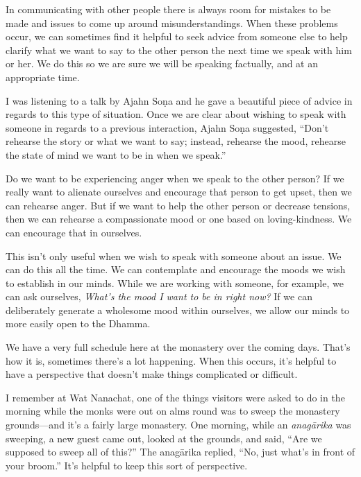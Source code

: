 
In communicating with other people there is always room for mistakes to 
be made and issues to come up around misunderstandings. When these 
problems occur, we can sometimes find it helpful to seek advice from 
someone else to help clarify what we want to say to the other person 
the next time we speak with him or her. We do this so we are sure we 
will be speaking factually, and at an appropriate time.

I was listening to a talk by Ajahn Soṇa and he gave a beautiful piece 
of advice in regards to this type of situation. Once we are clear about 
wishing to speak with someone in regards to a previous interaction, 
Ajahn Soṇa suggested, ``Don't rehearse the story or what we want to 
say; instead, rehearse the mood, rehearse the state of mind we want to 
be in when we speak.''

Do we want to be experiencing anger when we speak to the other person? 
If we really want to alienate ourselves and encourage that person to 
get upset, then we can rehearse anger. But if we want to help the other 
person or decrease tensions, then we can rehearse a compassionate mood 
or one based on loving-kindness. We can encourage that in ourselves.

This isn't only useful when we wish to speak with someone about an 
issue. We can do this all the time. We can contemplate and encourage 
the moods we wish to establish in our minds. While we are working with 
someone, for example, we can ask ourselves, \emph{What's the mood I 
want to be in right now?} If we can deliberately generate a wholesome 
mood within ourselves, we allow our minds to more easily open to the 
Dhamma.


We have a very full schedule here at the monastery over the coming 
days. That's how it is, sometimes there's a lot happening. When this 
occurs, it's helpful to have a perspective that doesn't make things 
complicated or difficult.

I remember at Wat Nanachat, one of the things visitors were asked to do 
in the morning while the monks were out on alms round was to sweep the 
monastery grounds---and it's a fairly large monastery. One morning, 
while an \emph{anagārika} was sweeping, a new guest came out, looked 
at the grounds, and said, ``Are we supposed to sweep all of this?'' The 
anagārika replied, ``No, just what's in front of your broom.'' It's 
helpful to keep this sort of perspective.

